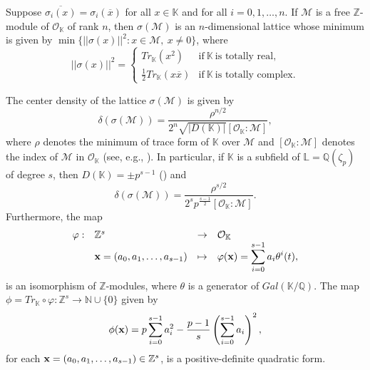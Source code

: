 \documentclass{amsart}
\begin{document}
Suppose $\overline{\sigma_i(x)}=\sigma_i(\overline{x})$ for all $x\in\mathbb{K}$ and for all $i=0,1,\ldots,n$. If $\mathcal{M}$ is a free $\mathbb{Z}$-module of $\mathcal{O}_{\mathbb{K}}$ of rank $n$, then $\sigma(\mathcal{M})$ is an $n$-dimensional lattice whose minimum is given by $\min\{||\sigma(x)||^2:x\in\mathcal{M},\ x\neq 0\}$, where \[ ||\sigma(x)||^2 = \left\{ \begin{array}{ll} Tr_{\mathbb{K}}(x^2) & \mbox{if} \ \mathbb{K} \ \mbox{is totally real,}\\  \frac{1}{2}Tr_{\mathbb{K}}(x\overline{x}) & \mbox{if} \ \mathbb{K} \ \mbox{is totally complex}. \end{array} \right. \] %

The center density of the lattice $\sigma(\mathcal{M})$ is given by \begin{equation} \label{densidade} \delta(\sigma(\mathcal{M})) = \frac{\rho^{n/2}}{2^n\sqrt{|D(\mathbb{K})|}[\mathcal{O}_{\mathbb{K}}:\mathcal{M}]}, \end{equation} where $\rho$ denotes the minimum of trace form of $\mathbb{K}$ over $\mathcal{M}$ and $[\mathcal{O}_{\mathbb{K}}:\mathcal{M}]$ denotes the index of $\mathcal{M}$ in $\mathcal{O}_{\mathbb{K}}$ (see, e.g., \cite{samuel}). 
In particular, if $\mathbb{K}$ is a subfield of $\mathbb{L}=\mathbb{Q}(\zeta_p)$ of degree $s$, then $D(\mathbb{K})=\pm p^{s-1}$ (\cite[Corollary 4.2]{trajano}) and 
\begin{equation}\label{eq_delta} \delta(\sigma(\mathcal{M})) = \frac{\rho^{s/2}}{2^sp^{\frac{s-1}{2}}[\mathcal{O}_{\mathbb{K}}:\mathcal{M}]}. \end{equation}
Furthermore, the map \[ \begin{array}{llll} \varphi:&\mathbb{Z}^s & \rightarrow & \mathcal{O}_{\mathbb{K}}\\ & {\bf x}=(a_0,a_1,\ldots,a_{s-1}) & \mapsto & \displaystyle \varphi({\bf x})=\sum_{i=0}^{s-1}a_i\theta^i(t), \end{array} \] is an isomorphism of $\mathbb{Z}$-modules, where $\theta$ is a generator of $Gal(\mathbb{K}/\mathbb{Q})$. The map $\phi=Tr_{\mathbb{K}}\circ\varphi:\mathbb{Z}^s\rightarrow \mathbb{N}\cup\{0\}$ given by \[ \phi({\bf x})=p\sum_{i=0}^{s-1}a_i^2-\frac{p-1}{s}\left(\sum_{i=0}^{s-1}a_i\right)^2, \] for each ${\bf x}=(a_0,a_1,\ldots,a_{s-1})\in\mathbb{Z}^s$, is a positive-definite quadratic form.
\end{document}
